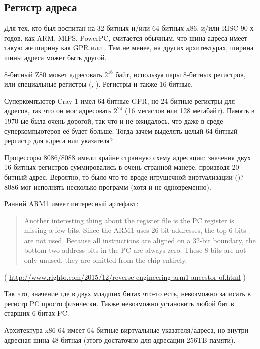 \subsection{Регистр адреса}

Для тех, кто был воспитан на 32-битных и/или 64-битных x86, и/или RISC 90-х годов, как ARM, MIPS, PowerPC, считается
обычным, что шина адреса имеет такую же ширину как \ac{GPR} или .
Тем не менее, на других архитектурах, ширина шины адреса может быть другой.

8-битный Z80 может адресовать $2^{16}$ байт, используя пары 8-битных регистров, или специальные регистры (, ).
Регистры  и  также 16-битные.

Суперкомпьютер Cray-1 имел 64-битные GPR, но 24-битные регистры для адресов, так что он мог адресовать
$2^{24}$ (16 мегаслов или 128 мегабайт).
Память в 1970-ые была очень дорогой, так что и не ожидалось, что даже в среде суперкомпьютеров её будет больше.
Тогда зачем выделять целый 64-битный рергистр для адреса или указателя?

Процессоры 8086/8088 имели крайне странную схему адресации:
значения двух 16-битных регистров суммировались в очень странной манере, производя 20-битный адрес.
Вероятно, то было что-то вроде игрушечной виртуализации ()?
8086 мог исполнять несколько программ (хотя и не одновременно).

Ранний ARM1 имеет интересный артефакт:

\begin{framed}
\begin{quotation}
Another interesting thing about the register file is the PC register is missing a few bits. Since the ARM1 uses 26-bit addresses, the top 6 bits are not used. Because all instructions are aligned on a 32-bit boundary, the bottom two address bits in the PC are always zero. These 8 bits are not only unused, they are omitted from the chip entirely.
\end{quotation}
\end{framed}

( \url{http://www.righto.com/2015/12/reverse-engineering-arm1-ancestor-of.html} )

Так что, значение где в двух младших битах что-то есть, невозможно записать в регистр PC просто физически.
Также невозможно установить любой бит в старших 6 битах PC.

Архитектура x86-64 имеет 64-битные виртуальные указателя/адреса, но внутри адресная шина 48-битная
(этого достаточно для адресации 256TB памяти).

